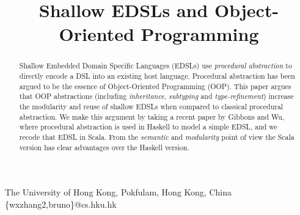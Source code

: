 \documentclass[10pt,preprint,numbers,nocopyrightspace]{sigplanconf}
\begin{document}
\setlength{\pdfpageheight}{\paperheight}
\setlength{\pdfpagewidth}{\paperwidth}




\title{Shallow EDSLs and Object-Oriented Programming}

           {The University of Hong Kong, Pokfulam, Hong Kong, China}
           {\{wxzhang2,bruno\}@cs.hku.hk}

\maketitle

\begin{abstract}

Shallow Embedded Domain Specific Languages (EDSLs) use
\emph{procedural abstraction} to directly encode a DSL into an existing host language. Procedural abstraction has
been argued to be the essence of Object-Oriented Programming (OOP). 
This paper argues that OOP abstractions 
(including \emph{inheritance}, \emph{subtyping} and
\emph{type-refinement}) 
increase the modularity and reuse of shallow
EDSLs when compared to classical procedural abstraction. We make this
argument by taking a recent paper by Gibbons and Wu, where procedural
abstraction is used in Haskell to model a simple EDSL, and we recode
that EDSL in Scala. From the \emph{semantic}
and \emph{modularity} point of view the Scala version has clear advantages 
over the Haskell version. 

\end{abstract}
\end{document}
